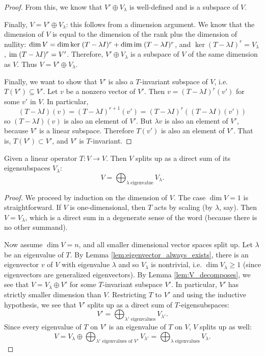 \begin{proof}
From this, we know that $V' \oplus V_\lambda$ is well-defined
and is a subspace of $V$.

Finally, $V = V' \oplus V_\lambda$: this follows from a dimension
argument. We know that the dimension of $V$ is equal to the
dimension of the rank plus the dimension of nullity:
$\dim V = \dim \mathrm{ker}\; (T - \lambda I)^r + \dim \mathrm{im}\; (T - \lambda I)^r$,
and $\ker (T - \lambda I)^r = V_\lambda$, $\mathrm{im}\; (T - \lambda I)^r =
V'$. Therefore, $V' \oplus V_\lambda$ is a subspace of $V$ of the same
dimension as $V$. Thus $V = V' \oplus V_\lambda$.

Finally, we want to show that $V'$ is also a $T$-invariant 
subspace of $V$, i.e. $T(V') \subseteq V'$. Let $v$ be a nonzero
vector of $V'$. Then $v = (T - \lambda I)^r(v')$ for some $v'$ in
$V$. In particular, 
\[
(T - \lambda I)(v) = (T - \lambda I)^{r + 1}(v') = (T - \lambda I)^{r}((T - \lambda I)(v'))
\]
so $(T - \lambda I)(v)$ is also an element of $V'$. But
$\lambda v$ is also an element of $V'$, because $V'$ is a linear
subspace. Therefore $T(v')$ is also an element of $V'$.
That is, $T(V') \subset V'$, and $V'$ is $T$-invariant.
\end{proof}

\begin{lem}\label{lem:V_splits_up}
Given a linear operator $T: V \to V$. Then $V$ splits up as a direct
sum of its eigensubspaces $V_\lambda$:
\[
V = \bigoplus_{\lambda\;\mathrm{eigenvalue}} V_\lambda.
\]
\end{lem}
\begin{proof}
We proceed by induction on the dimension of $V$. The case
$\dim V = 1$ is straightforward. If $V$ is one-dimensional, then
$T$ acts by scaling (by $\lambda$, say). Then $V = V_\lambda$,
which is a direct sum in a degenerate sense of the word (because
there is no other summand).

Now assume $\dim V = n$, and all smaller dimensional vector spaces
split up. Let $\lambda$ be an eigenvalue of $T$. By Lemma 
\ref{lem:eigenvector_always_exists}, there is an eigenvector $v$ of
$V$ with eigenvalue $\lambda$ and so $V_\lambda$ is nontrivial, i.e.
$\dim V_\lambda \geq 1$ (since eigenvectors are generalized
eigenvectors). By Lemma \ref{lem:V_decomposes}, we see that
$V = V_\lambda \oplus V'$ for some $T$-invariant subspace $V'$. In
particular, $V'$ has strictly smaller dimension than $V$.
Restricting $T$ to $V'$ and using the inductive hypothesis, we see
that $V'$ splits up as a direct sum of $T$-eigensubspaces:
\[
V' = \bigoplus_{\lambda' \textrm{ eigenvalues}} V_{\lambda'}.
\]
Since every eigenvalue of $T$ on $V'$ is an eigenvalue of
$T$ on $V$, $V$ splits up as well:
\[
V = V_\lambda \oplus \bigoplus_{\lambda' \textrm{ eigenvalues of }V'}
V_{\lambda'}
= \bigoplus_{\lambda \textrm{ eigenvalues}} V_\lambda.
\]
\end{proof}

